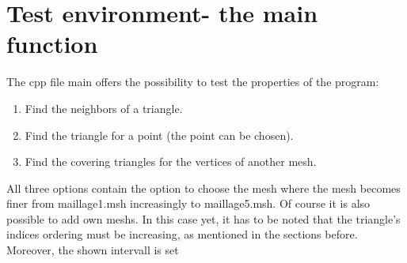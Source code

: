 \documentclass[10pt]{article}
\begin{document}
\section{Test environment- the main function}
	The cpp file main offers the possibility to test the properties of the program:
	\begin{enumerate}
		\item 
		Find the neighbors of a triangle.
		\item 
		Find the triangle for a point (the point can be chosen).
		\item 
		Find the covering triangles for the vertices of another mesh. 
	\end{enumerate}
	All three options contain the option to choose the mesh where the mesh becomes finer from maillage1.msh increasingly to maillage5.msh. 
	Of course it is also possible to add own meshs. In this case yet, it has to be noted that the triangle's indices ordering must be increasing, as mentioned in the sections before. Moreover, the shown intervall is set 
	
\end{document}
